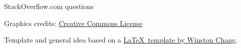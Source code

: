 \documentclass[10pt,landscape]{article}
\begin{document}
\begin{multicols}{3}
\begin{tiny}
StackOverflow.com questions %

Graphics credits: 	%
					\href{http://creativecommons.org/about/downloads}					{Creative Commons License}



Template and general idea based on a \href{http://www.stdout.org/~winston/latex/}{\LaTeX\ template by Winston Chang}.
\end{tiny}




\end{multicols}
\end{document}
